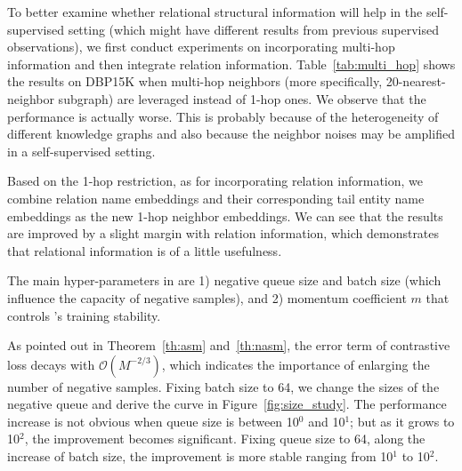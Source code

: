 To better examine whether relational structural information will help in the self-supervised setting (which might have different results from previous supervised observations), we first conduct experiments on incorporating multi-hop information and then integrate relation information. Table~\ref{tab:multi_hop} shows the results on DBP15K when multi-hop neighbors (more specifically, 20-nearest-neighbor subgraph) are leveraged instead of 1-hop ones. We observe that the performance is actually worse. This is probably because of the heterogeneity of different knowledge graphs and also because the neighbor noises may be amplified in a self-supervised setting. 



Based on the 1-hop restriction, as for incorporating relation information, we combine relation name embeddings and their corresponding tail entity name embeddings as the new 1-hop neighbor embeddings. We can see that the results are improved by a slight margin with relation information, which demonstrates that relational information is of a little usefulness.





The main hyper-parameters in \solution are 1) negative queue size and batch size (which influence the capacity of negative samples), and 2) momentum coefficient $m$ that controls \solution's training stability.

As pointed out in Theorem~\ref{th:asm} and~\ref{th:nasm}, the error term of contrastive loss decays with $\mathcal{O}(M^{-2/3})$, which indicates the importance of enlarging the number of negative samples. Fixing batch size to 64, we change the sizes of the negative queue and derive the curve in Figure~\ref{fig:size_study}. The performance increase is not obvious when queue size is between 10$^0$ and 10$^1$; but as it grows to 10$^2$, the improvement becomes significant. Fixing queue size to 64, along the increase of batch size, the improvement is more stable ranging from 10$^1$ to 10$^2$. 

